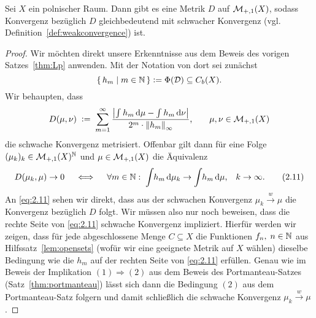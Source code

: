 \documentclass[../main/main.tex]{subfiles}
\begin{document}
	\begin{Satz}
		\label{thm:weakconvergencemetrizable}
		Sei $X$ ein polnischer Raum. Dann gibt es eine Metrik $D$ auf $\mathcal{M}_{+,1}(X)$, 
		sodass Konvergenz bezüglich $D$ gleichbedeutend mit schwacher Konvergenz 
		(vgl. Definition~\ref{def:weakconvergence}) ist.
	\end{Satz}

	\begin{proof}
		Wir möchten direkt unsere Erkenntnisse aus dem Beweis des vorigen 
		Satzes~\ref{thm:Lp} anwenden. Mit der Notation von dort sei zunächst 
		\[\left\{\, h_m \; \middle| \; m \in \mathbb{N} \,\right\} \vcentcolon = \Phi(\mathcal{D}) \subseteq C_b(X) \text{.}\] 
		Wir behaupten, dass
		\[D(\mu, \nu) \; \vcentcolon = \; \sum_{m=1}^{\infty} \frac{\left| \int_{} \, h_m \, \mathrm{d}\mu - 
			\int_{} \, h_m \, \mathrm{d}\nu \right|}{2^m \cdot \left\lVert h_m\right\rVert_\infty} \text{,} 
			\qquad \mu, \nu \in \mathcal{M}_{+,1}(X) \]
		die schwache Konvergenz metrisiert. Offenbar gilt dann für eine Folge 
		$(\mu_k)_k \in \mathcal{M}_{+,1}(X)^{\mathbb{N}}$ und $\mu \in \mathcal{M}_{+,1}(X)$ die 
		Äquivalenz
		\[ D(\mu_k, \mu) \to 0 \quad \iff \quad \forall m \in \mathbb{N}: \; 
			\int_{} \, h_m \, \mathrm{d}\mu_k \to \int_{} \, h_m \, \mathrm{d}\mu\text{,} 
			\quad k \to \infty \text{.} \label{eq:2.11} \tag{2.11} \]
		An \eqref{eq:2.11} sehen wir direkt, dass aus der schwachen Konvergenz 
		$\mu_k \xrightarrow{w} \mu$ die Konvergenz bezüglich $D$ folgt. Wir 
		müssen also nur noch beweisen, dass die rechte Seite von \eqref{eq:2.11} 
		schwache Konvergenz impliziert. Hierfür werden wir zeigen, dass für jede 
		abgeschlossene Menge $C \subseteq X$ die Funktionen $f_n, \; n \in \mathbb{N}$ aus 
		Hilfssatz~\ref{lem:opensets} (wofür wir eine geeignete Metrik auf $X$ wählen) 
		dieselbe Bedingung wie die $h_m$ auf der rechten Seite von \eqref{eq:2.11} 
		erfüllen. Genau wie im Beweis der Implikation $(1) \Rightarrow (2)$ aus dem 
		Beweis des Portmanteau-Satzes (Satz~\ref{thm:portmanteau}) lässt sich dann 
		die Bedingung $(2)$ aus dem Portmanteau-Satz folgern und damit schließlich 
		die schwache Konvergenz $\mu_k \xrightarrow{w} \mu$.
		

\end{proof}
\end{document}
